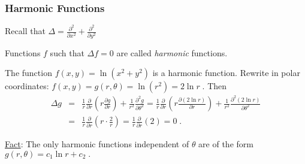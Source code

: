 \begin{frame}
\frametitle{Harmonic Functions}
Recall that $\Delta=\frac{\partial^2}{\partial x^2}+\frac{\partial^2}{\partial y^2}$
\begin{definition}
Functions $f$ such that $\Delta f=0$ are called \emph{harmonic} functions.
\end{definition}

\begin{example}
The function $f(x,y) = \ln{(x^2+y^2)}$ is a harmonic function.
\pause
Rewrite in polar coordinates: $f(x,y) = g(r,\theta) = \ln{(r^2)} = 2\ln r \; $.
Then
\[
\begin{array}{rcl}
\Delta g &= &\displaystyle \frac{1}{r}\frac{\partial }{\partial r} \left( r\frac{\partial g }{\partial r} \right) +  \frac{1}{r^2}\frac{\partial^2 g}{\partial \theta^2} = \frac{1}{r}\frac{\partial }{\partial r} \left( r\frac{\partial (2\ln{r}) }{\partial r} \right) +  \frac{1}{r^2}\frac{\partial^2 (2\ln{r})}{\partial \theta^2} \\
&= &\displaystyle \frac{1}{r}\frac{\partial }{\partial r} \left( r \cdot \frac{2}{r} \right) = \frac{1}{r}\frac{\partial }{\partial r} (2) = 0\; .
\end{array}
\]
\end{example}
\pause
\underline{Fact}: The only harmonic functions independent of $\theta$ are of the form
$g(r,\theta) = c_1\ln{r}+c_2 \; .$
\end{frame}